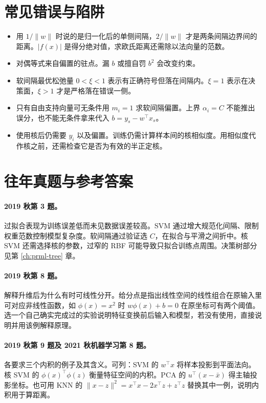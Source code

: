 \documentclass[UTF8,a4paper,zihao=-4,fontset=fandol]{ctexrep}
\begin{document}
\section{常见错误与陷阱}
\begin{itemize}
\item 用 $1/\|w\|$ 时说的是归一化后的单侧间隔，$2/\|w\|$ 才是两条间隔边界间的距离。$|f(x)|$ 是得分绝对值，求欧氏距离还需除以法向量的范数。
\item 对偶等式来自偏置的驻点。漏 $b$ 或擅自罚 $b^2$ 会改变约束。
\item 软间隔最优松弛量 $0<\xi<1$ 表示有正确符号但落在间隔内。$\xi=1$ 表示在决策面，$\xi>1$ 才是严格落在错误一侧。
\item 只有自由支持向量可无条件用 $m_i=1$ 求软间隔偏置。上界 $\alpha_i=C$ 不能推出误分，也不能无条件拿来代入 $b=y_s-w^\top x_s$。
\item 使用核后仍需要 $y_i$ 以及偏置。训练仍需计算样本间的核相似度。用相似度代作核之前，还需检查它是否为有效的半正定核。
\end{itemize}

\section{往年真题与参考答案}
\paragraph{2019 秋第 3 题。} 过拟合表现为训练误差低而未见数据误差较高。SVM 通过增大规范化间隔、限制权重范数控制模型复杂度。软间隔通过验证选 $C$，在拟合与平滑之间折中。核 SVM 还需选择核的参数，过窄的 RBF 可能导致只拟合训练点周围。决策树部分见第 \ref{ch:prml-tree} 章。
\paragraph{2019 秋第 8 题。} 解释升维后为什么有时可线性分开。给分点是指出线性空间的线性组合在原输入里可对应非线性函数，如 $\phi(x)=x^2$ 时 $w\phi(x)+b=0$ 在原坐标可有两个阈值。选一个自己确实完成过的实验说明特征变换前后输入和模型，若没有使用，直接说明并用该例解释原理。
\paragraph{2019 秋第 9 题及 2021 秋机器学习第 8 题。} 各要求三个内积的例子及其含义。可列：SVM 的 $w^\top x$ 将样本投影到平面法向。核 SVM 的 $\phi(x)^\top\phi(z)$ 衡量特征空间的内积。PCA 的 $u^\top(x-\bar x)$ 得主轴投影坐标。也可用 KNN 的 $\|x-z\|^2=x^\top x-2x^\top z+z^\top z$ 替换其中一例，说明内积用于算距离。
\end{document}
